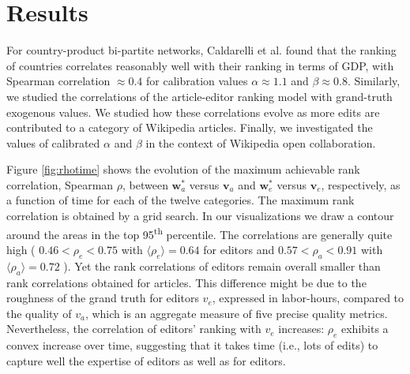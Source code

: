\section{Results}
For country-product bi-partite networks,  Caldarelli et al. \cite{caldarelli2012network} found that the ranking of countries correlates reasonably well with their ranking in terms of GDP, with Spearman correlation $\approx 0.4$ for calibration values $\alpha \approx 1.1$ and $\beta \approx 0.8$. Similarly, we studied the correlations of the article-editor ranking model with grand-truth exogenous values. We studied how these correlations evolve as more edits are contributed to a category of Wikipedia articles. Finally, we investigated the values of calibrated $\alpha$ and $\beta$ in the context of Wikipedia open collaboration.

Figure \ref{fig:rhotime} shows the evolution of the maximum achievable rank correlation, Spearman $\rho$, between $\mathbf{w}^*_a$ versus $\mathbf{v}_a$ and $\mathbf{w}^*_e$ versus $\mathbf{v}_e$, respectively, as a function of time for each of the twelve categories.  The maximum rank correlation is obtained by a grid search. In our visualizations we draw a contour around the areas in the top 95\textsuperscript{th} percentile.
The correlations are generally quite high ( $ 0.46 < \rho_e < 0.75$ with $\langle \rho_e\rangle = 0.64$ for editors and $0.57 < \rho_a < 0.91$ with $\langle \rho_a\rangle = 0.72$ ). Yet the rank correlations of editors remain overall smaller than rank correlations obtained for articles. This difference might be due to the roughness of the grand truth for editors $v_e$, expressed in labor-hours, compared to the quality of $v_a$, which is an aggregate measure of five precise quality metrics. Nevertheless, the correlation of editors' ranking with $v_e$ increases: $\rho_e$ exhibits a convex increase over time, suggesting that it takes time (i.e., lots of edits) to capture well the expertise of editors as well as for editors. 


